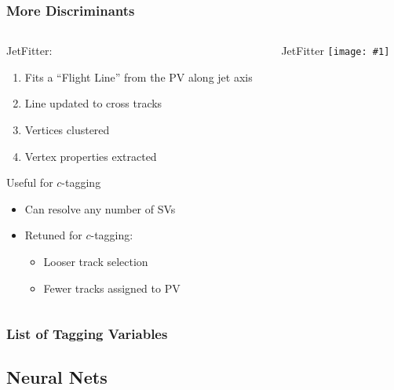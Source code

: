 \documentclass[usenames,dvipsnames]{beamer}
\newcommand{\widegraphic}[1]{\texttt{[image: \#1]}}
\begin{document}
\begin{frame}
  \frametitle{More Discriminants}
  \begin{columns}
    \begin{column}{0.5\textwidth}
      JetFitter:
      \begin{enumerate}
      \item Fits a ``Flight Line'' from the PV along jet axis
      \item Line updated to cross tracks
      \item Vertices clustered
      \item Vertex properties extracted
      \end{enumerate}
      Useful for $c$-tagging
      \begin{itemize}
      \item Can resolve any number of SVs
      \item Retuned for $c$-tagging:
        \begin{itemize}
        \item Looser track selection
        \item Fewer tracks assigned to PV
        \end{itemize}
      \end{itemize}
    \end{column}
    \begin{column}{0.5\textwidth}
        \begin{center}
          JetFitter
      \widegraphic{figures/external/b-jet-jf.pdf}
        \end{center}
    \end{column}
  \end{columns}
\end{frame}

\begin{frame}
  \frametitle{List of Tagging Variables}
  \resizebox{\textwidth}{!}{}
\end{frame}

\subsection{Neural Nets}
\end{document}

